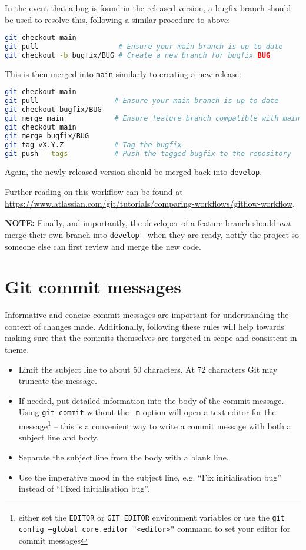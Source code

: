 \documentclass[11pt]{report}
\begin{document}
In the event that a bug is found in the released version, a bugfix branch should be used to resolve
this, following a similar procedure to above:
\begin{lstlisting}[language=sh, basicstyle=\fontsize{9}{10}\ttfamily\label{lst:bugfix-branch}]
git checkout main
git pull                   # Ensure your main branch is up to date
git checkout -b bugfix/BUG # Create a new branch for bugfix BUG
\end{lstlisting}
This is then merged into \texttt{main} similarly to creating a new release:
\begin{lstlisting}[language=sh, basicstyle=\fontsize{9}{10}\ttfamily\label{lst:release-merge}]
git checkout main
git pull                  # Ensure your main branch is up to date
git checkout bugfix/BUG
git merge main            # Ensure feature branch compatible with main
git checkout main
git merge bugfix/BUG
git tag vX.Y.Z            # Tag the bugfix
git push --tags           # Push the tagged bugfix to the repository
\end{lstlisting}
Again, the newly released version should be merged back into \texttt{develop}.

Further reading on this workflow can be found at
\url{https://www.atlassian.com/git/tutorials/comparing-workflows/gitflow-workflow}.

\textbf{NOTE:} Finally, and importantly, the developer of a feature branch should \emph{not} merge their
own branch into \texttt{develop} - when they are ready, notify the project so someone else can first review and merge the new code.

\section{Git commit messages}
Informative and concise commit messages are important for understanding the context of changes made. 
Additionally, following these rules will help towards making sure that the commits themselves are targeted in scope and consistent in theme. 

\begin{itemize}
    \item Limit the subject line to about 50 characters. At 72 characters Git may truncate the message. 
    \item If needed, put detailed information into the body of the commit message. Using \texttt{git commit} without the \texttt{-m} option will 
    open a text editor for the message\footnote{either set the \texttt{EDITOR} or \texttt{GIT\_EDITOR} environment variables or use the 
    \texttt{git config --global core.editor "<editor>"} command to set your editor for commit messages} -- this is a convenient way to write a 
    commit message with both a subject line and body. 
    \item Separate the subject line from the body with a blank line.
    \item Use the imperative mood in the subject line, e.g. ``Fix initialisation bug'' instead of ``Fixed initialisation bug''.
\end{itemize}
\end{document}
